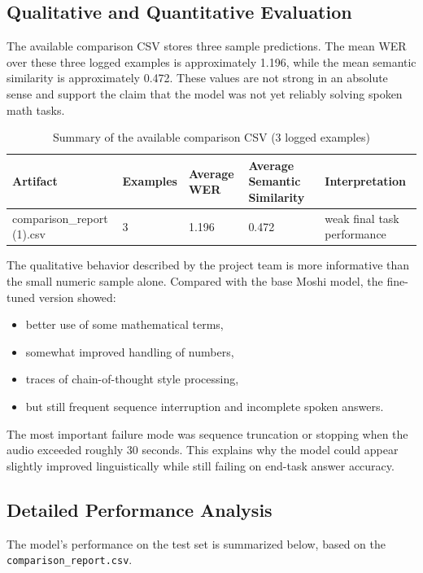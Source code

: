 \documentclass[12pt,a4paper]{article}
\begin{document}
\subsection{Qualitative and Quantitative Evaluation}
The available comparison CSV stores three sample predictions. The mean WER over these three logged examples is approximately 1.196, while the mean semantic similarity is approximately 0.472. These values are not strong in an absolute sense and support the claim that the model was not yet reliably solving spoken math tasks.

\begin{table}[H]
\centering
\scriptsize
\caption{Summary of the available comparison CSV (3 logged examples)}
\begin{tabular}{p{1.5in}p{0.6in}p{0.9in}p{1.7in}p{1.0in}}
\toprule
\textbf{Artifact} & \textbf{Examples} & \textbf{Average WER} & \textbf{Average Semantic Similarity} & \textbf{Interpretation} \\
\midrule
comparison\_report (1).csv & 3 & 1.196 & 0.472 & weak final task performance \\
\bottomrule
\end{tabular}
\end{table}
\normalsize

The qualitative behavior described by the project team is more informative than the small numeric sample alone. Compared with the base Moshi model, the fine-tuned version showed:
\begin{itemize}[leftmargin=1.5em]
    \item better use of some mathematical terms,
    \item somewhat improved handling of numbers,
    \item traces of chain-of-thought style processing,
    \item but still frequent sequence interruption and incomplete spoken answers.
\end{itemize}

The most important failure mode was sequence truncation or stopping when the audio exceeded roughly 30 seconds. This explains why the model could appear slightly improved linguistically while still failing on end-task answer accuracy.

\subsection{Detailed Performance Analysis}
The model's performance on the test set is summarized below, based on the \texttt{comparison\_report.csv}.
\end{document}
